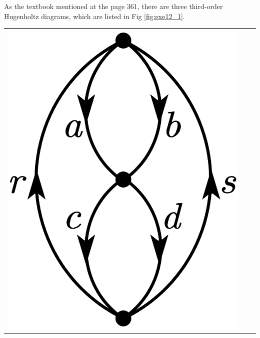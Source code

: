 \documentclass[a4paper]{book}
\newcounter{solution}[chapter]
\newcommand\Figref[1]{Fig \ref{#1}}
\begin{document}
	\begin{solution}

	As the textbook mentioned at the page 361, there are three third-order Hugenholtz diagrams, which are listed in \Figref{fig:exe12_1}.

	\begin{center}
	\begin{tabular}{ccc}
	
		\begin{minipage}{0.22\linewidth}
		\centering
		\includegraphics[scale=1.0,trim=0 -4 0 -4]{./pictures/6.12/hugenholtz_1.png}
		\end{minipage} &
		

\end{tabular}
\end{center}
\end{solution}
\end{document}
